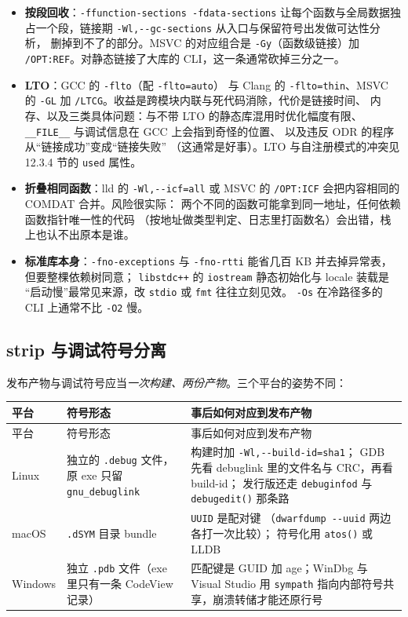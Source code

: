 \documentclass[12pt,a4paper,fontset=fandol]{ctexbook}
\newcommand{\Fn}[1]{\texttt{#1()}}
\newcommand{\Tp}[1]{\texttt{#1}}
\newcommand{\Short}[1]{\texttt{-#1}}
\begin{document}
\begin{itemize}
\item \textbf{按段回收}：\lstinline{-ffunction-sections -fdata-sections}
      让每个函数与全局数据独占一个段，链接期
      \lstinline{-Wl,--gc-sections} 从入口与保留符号出发做可达性分析，
      删掉到不了的部分。MSVC 的对应组合是 \Short{Gy}（函数级链接）加
      \Tp{/OPT:REF}。对静态链接了大库的 CLI，这一条通常砍掉三分之一。
\item \textbf{LTO}：GCC 的 \Short{flto}（配 \Short{flto=auto}）
      与 Clang 的 \lstinline{-flto=thin}、MSVC 的 \Short{GL} 加
      \Tp{/LTCG}。收益是跨模块内联与死代码消除，代价是链接时间、
      内存、以及三类具体问题：与不带 LTO 的静态库混用时优化幅度有限、
      \Tp{\_\_FILE\_\_} 与调试信息在 GCC 上会指到奇怪的位置、
      以及违反 ODR 的程序从``链接成功''变成``链接失败''
      （这通常是好事）。LTO 与自注册模式的冲突见 12.3.4 节的
      \Tp{used} 属性。
\item \textbf{折叠相同函数}：lld 的 \lstinline{-Wl,--icf=all} 或
      MSVC 的 \Tp{/OPT:ICF} 会把内容相同的 COMDAT 合并。风险很实际：
      两个不同的函数可能拿到同一地址，任何依赖函数指针唯一性的代码
      （按地址做类型判定、日志里打函数名）会出错，栈上也认不出原本是谁。
\item \textbf{标准库本身}：\Short{fno-exceptions} 与
      \Short{fno-rtti} 能省几百 KB 并去掉异常表，但要整棵依赖树同意；
      \Tp{libstdc++} 的 \Tp{iostream} 静态初始化与 locale 装载是
      ``启动慢''最常见来源，改 \Tp{stdio} 或 \Tp{fmt} 往往立刻见效。
      \lstinline{-Os} 在冷路径多的 CLI 上通常不比 \Short{O2} 慢。
\end{itemize}

\subsection{strip 与调试符号分离}

发布产物与调试符号应当\emph{一次构建、两份产物}。三个平台的姿势不同：

\begin{longtable}{@{}>{\raggedright\arraybackslash}p{}
                 >{\raggedright\arraybackslash}p{}
                 >{\raggedright\arraybackslash}p{}@{}}
\toprule
平台 & 符号形态 & 事后如何对应到发布产物 \\
\midrule
\endfirsthead
\toprule
平台 & 符号形态 & 事后如何对应到发布产物 \\
\midrule
\endhead
Linux & 独立的 \Tp{.debug} 文件，原 exe 只留 \Tp{gnu\_debuglink}
& 构建时加 \lstinline|-Wl,--build-id=sha1|；
GDB 先看 debuglink 里的文件名与 CRC，再看 build-id；
发行版还走 \Tp{debuginfod} 与 \Fn{debugedit} 那条路 \\
macOS & \Tp{.dSYM} 目录 bundle & \Tp{UUID} 是配对键
（\lstinline|dwarfdump --uuid| 两边各打一次比较）；
符号化用 \Fn{atos} 或 LLDB \\
Windows & 独立 \Tp{.pdb} 文件（exe 里只有一条 CodeView 记录） &
匹配键是 GUID 加 age；WinDbg 与 Visual Studio 用
\Tp{sympath} 指向内部符号共享，崩溃转储才能还原行号 \\
\bottomrule
\end{longtable}
\end{document}
